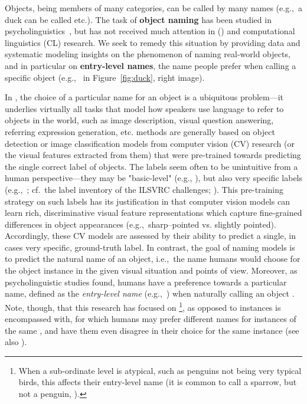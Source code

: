 

Objects, being members of many categories, can be called by many names (e.g.,\ a duck can be called  etc.). 
The task of \textbf{object naming} has been studied in psycholinguistics~\cite{refs}, but has not received much attention in \langvis (\lv) and computational linguistics (CL) research. 
We seek to remedy this situation by providing data and systematic modeling insights on the  phenomenon of naming real-world objects, and in particular on \textbf{entry-level names}, the name people  prefer when calling a specific object (e.g.,~ in Figure~\ref{fig:duck}, right image). 

In \lv, the choice of a particular name for an object is a ubiquitous problem---it underlies virtually all tasks that model how speakers use language to refer to objects in the world, such as image description, visual question answering, referring expression generation, etc. 
\lv methods are generally based on object detection or image classification models from computer vision (CV) research (or the visual features extracted from them) that were pre-trained towards predicting the single correct label of objects. 
The labels seem often to be unintuitive from a human perspective---they may be "basic-level" (e.g., ), but also very specific labels (e.g.,\ ; cf.\ the label inventory of the ILSVRC challenges; \citealt{ILSVRC15}). 
This pre-training strategy on such labels has its justification in that computer vision models can learn rich, discriminative visual feature representations which capture fine-grained differences in object appearances (e.g.,\ sharp--pointed vs. slightly pointed). 
Accordingly, these CV models are assessed by their ability to predict a single, in cases very specific, ground-truth label. 
In contrast, the goal of \lv naming models is to predict the natural name of an object, i.e.,~the name humans would choose for the object instance in the given visual situation and points of view. 
Moreover, as psycholinguistic studies found, humans have a preference towards a particular name, defined as the \textit{entry-level name} (e.g.,\ ) when naturally calling an object  \cite{rosch1976basic,Rosch1978,jolicoeur1984pictures}. 
Note, though, that this research has focused on \categories\footnote{When a sub-ordinate level \category is atypical, such as penguins not being very typical birds, this affects their entry-level name (it is common to call a sparrow, but not a penguin, ).}, as opposed to instances \lv is encompassed with, for which humans may prefer different names for instances of the same \category, and have them even disagree in their choice for the same instance (see also \citealt{graf2016animal}). 

